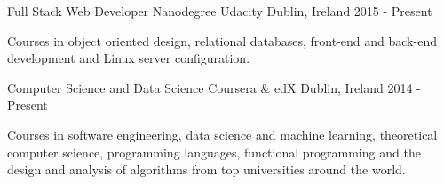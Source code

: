 \begin{cventries}
  \cventry
    {Full Stack Web Developer Nanodegree}
    {Udacity}
    {Dublin, Ireland}
    {2015 - Present}
    {
      \begin{cvitems}
      \item {Courses in object oriented design, relational databases, front-end and back-end development and Linux server configuration.}
      \end{cvitems}
    }
    
  \cventry
    {Computer Science and Data Science}
    {Coursera \& edX}
    {Dublin, Ireland}
    {2014 - Present}
    {
      \begin{cvitems}
      \item {Courses in software engineering, data science and machine learning, theoretical computer science, programming languages, functional programming and the design and analysis of algorithms from top universities around the world.}
      \end{cvitems}
    }
\end{cventries}